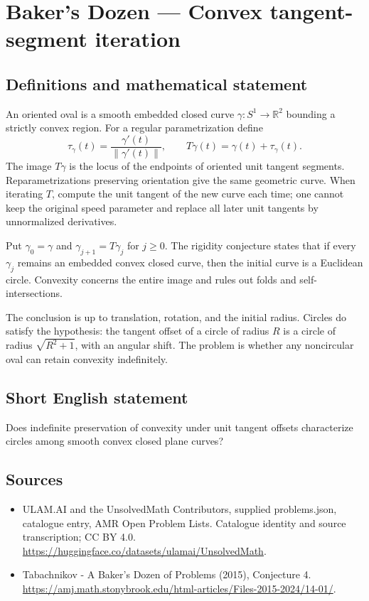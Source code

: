 \documentclass[11pt,a4paper]{article}
\begin{document}
\section*{Baker's Dozen — Convex tangent-segment iteration}\label{statement}

\subsection{Definitions and mathematical statement}
An oriented oval is a smooth embedded closed curve $\gamma:S^1\to\mathbb R^2$
bounding a strictly convex region. For a regular parametrization define
\[
 \tau_\gamma(t)=\frac{\gamma'(t)}{\|\gamma'(t)\|},\qquad
 T\gamma(t)=\gamma(t)+\tau_\gamma(t).
\]
The image $T\gamma$ is the locus of the endpoints of oriented unit tangent
segments. Reparametrizations preserving orientation give the same geometric
curve. When iterating $T$, compute the unit tangent of the new curve each
time; one cannot keep the original speed parameter and replace all later
unit tangents by unnormalized derivatives.

Put $\gamma_0=\gamma$ and $\gamma_{j+1}=T\gamma_j$ for $j\ge0$. The rigidity
conjecture states that if every $\gamma_j$ remains an embedded convex closed
curve, then the initial curve is a Euclidean circle. Convexity concerns the
entire image and rules out folds and self-intersections.

The conclusion is up to translation, rotation, and the initial radius.
Circles do satisfy the hypothesis: the tangent offset of a circle of radius
$R$ is a circle of radius $\sqrt{R^2+1}$, with an angular shift. The problem
is whether any noncircular oval can retain convexity indefinitely.
\subsection{Short English statement}
Does indefinite preservation of convexity under unit tangent offsets
characterize circles among smooth convex closed plane curves?
\subsection{Sources}
\begin{itemize}
\item[S1] ULAM.AI and the UnsolvedMath Contributors, supplied problems.json, catalogue entry, AMR Open Problem Lists. Catalogue identity and source transcription; CC BY 4.0.
\url{https://huggingface.co/datasets/ulamai/UnsolvedMath}.
\item[S2] Tabachnikov - A Baker's Dozen of Problems (2015), Conjecture 4. 
\url{https://amj.math.stonybrook.edu/html-articles/Files-2015-2024/14-01/}.
\end{itemize}
\end{document}
